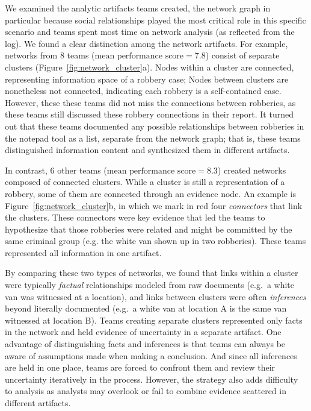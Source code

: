 We examined the analytic artifacts teams created, the network
graph in particular because social relationships played the most
critical role in this specific scenario and teams spent most time on
network analysis (as reflected from the log). We found a clear distinction among the network artifacts. For example, networks from
8 teams ($\text{mean performance score}=7.8$) consist of separate clusters
(Figure~\ref{fig:network_cluster}a). Nodes within a cluster are
connected, representing information space of a robbery case; Nodes
between clusters are nonetheless not connected, indicating each robbery
is a self-contained case. However, these these teams did not miss the connections between robberies, as these teams still discussed these robbery connections in their report.
It turned out that these teams documented any possible relationships between
robberies in the notepad tool as a list, separate from the network graph; that is, these teams distinguished information content and synthesized them in different artifacts.

In contrast, 6 other teams ($\text{mean performance score}=8.3$) created networks
composed of connected clusters. While a cluster is still a
representation of a robbery, some of them are connected through an
evidence node. An example is Figure~\ref{fig:network_cluster}b, in
which we mark in red four \emph{connectors} that link the clusters. These
connectors were key evidence that led the teams to hypothesize that
those robberies were related and might be committed by the same criminal
group (e.g. the white van shown up in two robberies). These teams represented all information in one artifact.

By comparing these two types of networks, we found that links within a cluster were typically
\emph{factual} relationships modeled from raw documents (e.g.~a white van was
witnessed at a location), and links between clusters were often
\emph{inferences} beyond literally documented (e.g.~a white van at location A
is the same van witnessed at location B). Teams creating separate
clusters represented only facts in the network and held evidence of
uncertainty in a separate artifact. One advantage of distinguishing
facts and inferences is that teams can always be aware of assumptions made when
making a conclusion. And since all inferences are held in one place,
teams are forced to confront them and review their uncertainty
iteratively in the process. However, the strategy also adds difficulty
to analysis as analysts may overlook or fail to combine evidence
scattered in different artifacts.


